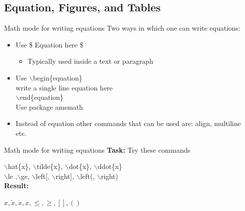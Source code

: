 \documentclass [9pt] {beamer}
\begin{document}
\subsection{Equation, Figures, and Tables}

\begin{frame}{Math mode for writing equations}
Two ways in which one can write equations:

\begin{itemize}
	\item Use \$ Equation here \$ 
	\begin{itemize}
		\item Typically used inside a text or paragraph
	\end{itemize}
	\item Use $\backslash$begin\{equation\}\\ 
	write a single line equation here\\
	 $\backslash$end\{equation\}\\[0.7cm]
	 
	 Use package \textcolor[rgb]{0.98,0.00,0.00}{amsmath}\\[0.2cm]
	 \item Instead of equation other commands that can be used are: align, multiline etc.  
\end{itemize}
\end{frame}

\begin{frame}{Math mode for writing equations}
\textbf{Task:} Try these commands

$\backslash$hat\{x\}, $\backslash$tilde\{x\}, $\backslash$dot\{x\}, $\backslash$ddot\{x\} \\[0.6cm]

$\backslash$le ,$\backslash$ge, $\backslash$left[, $\backslash$right], $\backslash$left(, $\backslash$right) \\[1cm]

\textbf{Result:}

\hspace{2cm} \textcolor[rgb]{0.98,0.00,0.00}{$\hat{x}, \tilde{x}, \dot{x}, \ddot{x}, \le, \ge, \left[\right], \left(\right) $}
\end{frame} 
\end{document}
